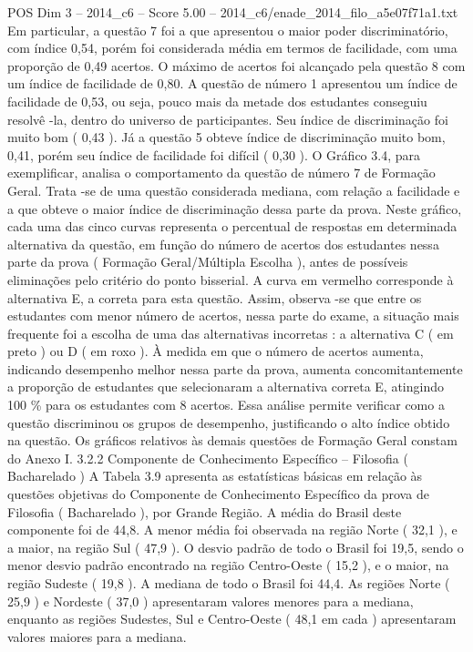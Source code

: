 \begin{textsample}{POS Dim 3 – 2014\_c6 – Score 5.00 – 2014\_c6/enade\_2014\_filo\_a5e07f71a1.txt}
Em particular, a questão 7 foi a que apresentou o maior poder discriminatório, com índice 0,54, porém foi considerada média em termos de facilidade, com uma proporção de 0,49 acertos.
O máximo de acertos foi alcançado pela questão 8 com um índice de facilidade de 0,80.
A questão de número 1 apresentou um índice de facilidade de 0,53, ou seja, pouco mais da metade dos estudantes conseguiu resolvê -la, dentro do universo de participantes.
Seu índice de discriminação foi muito bom ( 0,43 ).
Já a questão 5 obteve índice de discriminação muito bom, 0,41, porém seu índice de facilidade foi difícil ( 0,30 ).
O Gráfico 3.4, para exemplificar, analisa o comportamento da questão de número 7 de Formação Geral.
Trata -se de uma questão considerada mediana, com relação a facilidade e a que obteve o maior índice de discriminação dessa parte da prova.
Neste gráfico, cada uma das cinco curvas representa o percentual de respostas em determinada alternativa da questão, em função do número de acertos dos estudantes nessa parte da prova ( Formação Geral/Múltipla Escolha ), antes de possíveis eliminações pelo critério do ponto bisserial.
A curva em vermelho corresponde à alternativa E, a correta para esta questão.
Assim, observa -se que entre os estudantes com menor número de acertos, nessa parte do exame, a situação mais frequente foi a escolha de uma das alternativas incorretas : a alternativa C ( em preto ) ou D ( em roxo ).
À medida em que o número de acertos aumenta, indicando desempenho melhor nessa parte da prova, aumenta concomitantemente a proporção de estudantes que selecionaram a alternativa correta E, atingindo 100 \% para os estudantes com 8 acertos.
Essa análise permite verificar como a questão discriminou os grupos de desempenho, justificando o alto índice obtido na questão.
Os gráficos relativos às demais questões de Formação Geral constam do Anexo I. 3.2.2 Componente de Conhecimento Específico – Filosofia ( Bacharelado ) A Tabela 3.9 apresenta as estatísticas básicas em relação às questões objetivas do Componente de Conhecimento Específico da prova de Filosofia ( Bacharelado ), por Grande Região.
A média do Brasil deste componente foi de 44,8.
A menor média foi observada na região Norte ( 32,1 ), e a maior, na região Sul ( 47,9 ).
O desvio padrão de todo o Brasil foi 19,5, sendo o menor desvio padrão encontrado na região Centro-Oeste ( 15,2 ), e o maior, na região Sudeste ( 19,8 ).
A mediana de todo o Brasil foi 44,4.
As regiões Norte ( 25,9 ) e Nordeste ( 37,0 ) apresentaram valores menores para a mediana, enquanto as regiões Sudestes, Sul e Centro-Oeste ( 48,1 em cada ) apresentaram valores maiores para a mediana.

\end{textsample}
